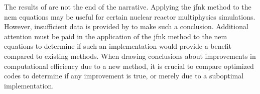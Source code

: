   The results of \citeauthor{caslJFNK} are not the end of the narrative. 
  Applying the \gls{jfnk} method to the \gls{nem} equations may be useful for
  certain nuclear reactor multiphysics simulations. However, insufficient data 
  is provided by \citeauthor{qe2paper} to make such a conclusion. Additional
  attention must be paid in the application of the \gls{jfnk} method to the
  \gls{nem} equations to determine if such an implementation would provide
  a benefit compared to existing methods. When drawing conclusions about
  improvements in computational efficiency due to a new method, it is crucial to 
  compare optimized codes to determine if any improvement is true, or merely due
  to a suboptimal implementation.
